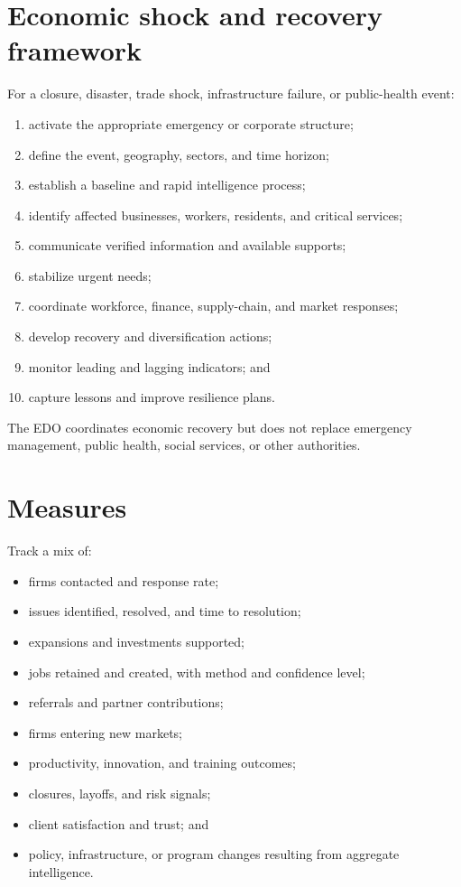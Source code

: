 \documentclass[11pt,letterpaper,oneside,openany]{book}
\begin{document}
\section[Economic shock and recovery framework]{Economic shock and recovery framework}
For a closure, disaster, trade shock, infrastructure failure, or public-health event:


\begin{enumerate}
\item activate the appropriate emergency or corporate structure;
\item define the event, geography, sectors, and time horizon;
\item establish a baseline and rapid intelligence process;
\item identify affected businesses, workers, residents, and critical services;
\item communicate verified information and available supports;
\item stabilize urgent needs;
\item coordinate workforce, finance, supply-chain, and market responses;
\item develop recovery and diversification actions;
\item monitor leading and lagging indicators; and
\item capture lessons and improve resilience plans.
\end{enumerate}


The EDO coordinates economic recovery but does not replace emergency management, public health, social services, or other authorities.


\section[Measures]{Measures}
Track a mix of:


\begin{itemize}
\item firms contacted and response rate;
\item issues identified, resolved, and time to resolution;
\item expansions and investments supported;
\item jobs retained and created, with method and confidence level;
\item referrals and partner contributions;
\item firms entering new markets;
\item productivity, innovation, and training outcomes;
\item closures, layoffs, and risk signals;
\item client satisfaction and trust; and
\item policy, infrastructure, or program changes resulting from aggregate intelligence.
\end{itemize}
\end{document}
